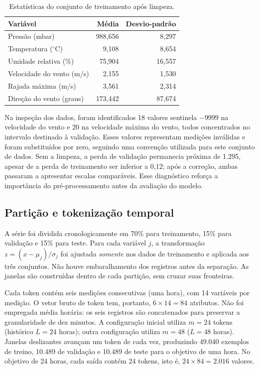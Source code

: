 \documentclass[conference,a4paper]{IEEEtran}
\begin{document}
\begin{table}[!t]
\centering
\caption{Estatísticas do conjunto de treinamento após limpeza.}
\label{tab:estatisticas}
\footnotesize
\begin{tabular}{@{}lrr@{}}
\toprule
Variável & Média & Desvio-padrão \\
\midrule
Pressão (mbar) & 988,656 & 8,297 \\
Temperatura ($^\circ$C) & 9,108 & 8,654 \\
Umidade relativa (\%) & 75,904 & 16,557 \\
Velocidade do vento (m/s) & 2,155 & 1,530 \\
Rajada máxima (m/s) & 3,561 & 2,314 \\
Direção do vento (graus) & 173,442 & 87,674 \\
\bottomrule
\end{tabular}
\end{table}

Na inspeção dos dados, foram identificados 18 valores sentinela $-9999$ na velocidade do vento e 20 na velocidade máxima do vento, todos concentrados no intervalo destinado à validação. Esses valores representam medições inválidas e foram substituídos por zero, seguindo uma convenção utilizada para este conjunto de dados. Sem a limpeza, a perda de validação permanecia próxima de 1.295, apesar de a perda de treinamento ser inferior a 0,12; após a correção, ambas passaram a apresentar escalas comparáveis. Esse diagnóstico reforça a importância do pré-processamento antes da avaliação do modelo.

\subsection{Partição e tokenização temporal}
A série foi dividida cronologicamente em 70\% para treinamento, 15\% para validação e 15\% para teste. Para cada variável $j$, a transformação $z=(x-\mu_j)/\sigma_j$ foi ajustada \emph{somente} nos dados de treinamento e aplicada aos três conjuntos. Não houve embaralhamento dos registros antes da separação. As janelas são construídas dentro de cada partição, sem cruzar suas fronteiras.

Cada token contém seis medições consecutivas (uma hora), com 14 variáveis por medição. O vetor bruto de token tem, portanto, $6\times14=84$ atributos. Não foi empregada média horária: os seis registros são concatenados para preservar a granularidade de dez minutos. A configuração inicial utiliza $m=24$ tokens (histórico $L=24$ horas); outra configuração utiliza $m=48$ ($L=48$ horas). Janelas deslizantes avançam um token de cada vez, produzindo 49.040 exemplos de treino, 10.489 de validação e 10.489 de teste para o objetivo de uma hora. No objetivo de 24 horas, cada saída contém 24 tokens, isto é, $24\times84=2.016$ valores.
\end{document}
